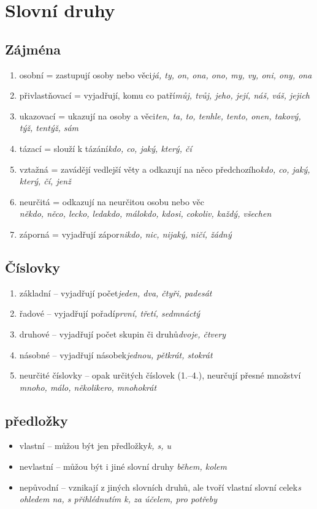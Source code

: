 \documentclass{memoir}
\begin{document}
\section*{Slovní druhy}
	\subsection*{Zájména}
	\begin{enumerate}
		\item osobní = zastupují osoby nebo věci\hfill\textit{já, ty, on, ona, ono, my, vy, oni, ony, ona}
		\item přivlastňovací = vyjadřují, komu co patří\hfill\textit{můj, tvůj, jeho, její, náš, váš, jejich}
		\item ukazovací = ukazují na osoby a věci\hfill\textit{ten, ta, to, tenhle, tento, onen, takový, týž, tentýž, sám}
		\item tázací = slouží k tázání\hfill\textit{kdo, co, jaký, který, čí}
		\item vztažná = zavádějí vedlejší věty a odkazují na něco předchozího\hfill\textit{kdo, co, jaký, který, čí, jenž}
		\item neurčitá = odkazují na neurčitou osobu nebo věc\\\textit{někdo, něco, lecko, ledakdo, málokdo, kdosi, cokoliv, každý, všechen}
		\item záporná = vyjadřují zápor\hfill\textit{nikdo, nic, nijaký, ničí, žádný}
	\end{enumerate}
	\subsection*{Číslovky}
		\begin{enumerate}
			\item základní -- vyjadřují počet\hfill\textit{jeden, dva, čtyři, padesát}
			\item řadové -- vyjadřují pořadí\hfill\textit{první, třetí, sedmnáctý}
			\item druhové -- vyjadřují počet skupin či druhů\hfill\textit{dvoje, čtvery}
			\item násobné -- vyjadřují násobek\hfill\textit{jednou, pětkrát, stokrát}
			\item neurčité číslovky -- opak určitých číslovek (1.--4.), neurčují přesné množství \hfill\textit{mnoho, málo, několikero, mnohokrát}
		\end{enumerate}
	\subsection*{předložky}
	\begin{itemize}
		\item vlastní -- můžou být jen předložky\hfill\textit{k, s, u}
		\item nevlastní -- můžou být i jiné slovní druhy \hfill\textit{během, kolem}
		\item nepůvodní -- vznikají z jiných slovních druhů, ale tvoří vlastní slovní celek\hfill\textit{s ohledem na, s přihlédnutím k, za účelem, pro potřeby}
	\end{itemize}
\end{document}

